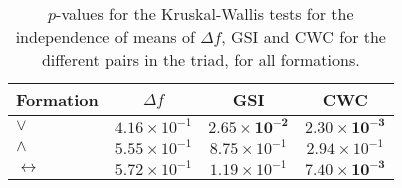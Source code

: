 \begin{table}
\centering
\caption{$p$-values for the Kruskal-Wallis tests for the independence of means of $\Delta f$, GSI and CWC for the different pairs in the triad, for all formations.}
\label{tab:p_values_triads_formations}
\begin{tabular}{lccc}
\toprule
Formation & $\Delta f$ & GSI & CWC \\
\midrule
$\vee$ & $4.16 \times 10^{-1}$ & $\mathbf{2.65 \times 10^{-2}}$ & $\mathbf{2.30 \times 10^{-3}}$ \\
$\wedge$ & $5.55 \times 10^{-1}$ & $8.75 \times 10^{-1}$ & $2.94 \times 10^{-1}$ \\
$\longleftrightarrow$ & $5.72 \times 10^{-1}$ & $1.19 \times 10^{-1}$ & $\mathbf{7.40 \times 10^{-3}}$ \\
\bottomrule
\end{tabular}
\end{table}
